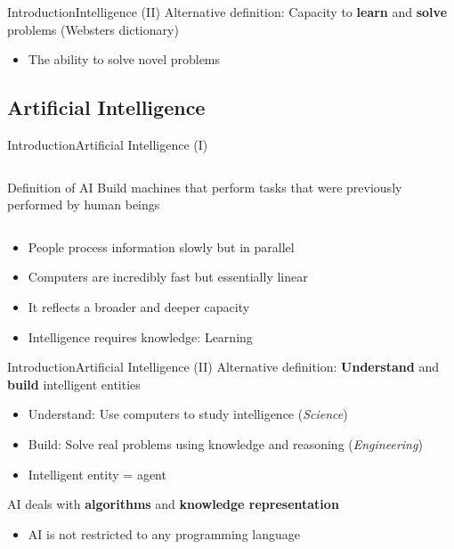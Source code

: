 \documentclass[10pt,compress]{beamer} %
\begin{document}
\begin{frame}{Introduction}{Intelligence (II)}
	Alternative definition: Capacity to \textbf{learn} and \textbf{solve} problems (Websters dictionary)
	\begin{itemize}
		\item The ability to solve novel problems
	\end{itemize}
\end{frame}

\subsection{Artificial Intelligence}
\begin{frame}{Introduction}{Artificial Intelligence (I)}
	\begin{columns}
		\begin{block}{Definition of AI}
			Build machines that perform tasks that were previously performed by human beings
		\end{block}
	\end{columns}
	\bigskip
	\begin{itemize}
		\item People process information slowly but in parallel
		\item Computers are incredibly fast but essentially linear
		\item It reflects a broader and deeper capacity
		\item Intelligence requires knowledge: \alert{Learning}
	\end{itemize}
\end{frame}

\begin{frame}{Introduction}{Artificial Intelligence (II)}
	Alternative definition: \textbf{Understand} and \textbf{build} intelligent entities
	\begin{itemize}
		\item Understand: Use computers to study intelligence (\textit{Science})
		\item Build: Solve real problems using knowledge and reasoning (\textit{Engineering})
		\item Intelligent entity = \alert{agent}
	\end{itemize}
	AI deals with \textbf{algorithms} and \textbf{knowledge representation}
	\begin{itemize}
		\item AI is not restricted to any programming language
	\end{itemize}
\end{frame}
\end{document}
